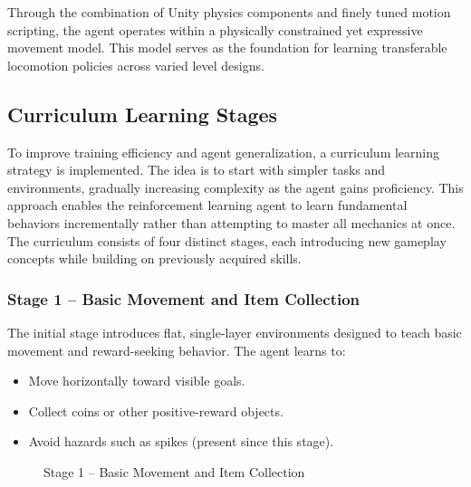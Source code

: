\documentclass[12pt,oneside,openright,a4paper]{cpe-english-project}
\begin{document}
Through the combination of Unity physics components and finely tuned motion scripting, the agent operates within a physically constrained yet expressive movement model. This model serves as the foundation for learning transferable locomotion policies across varied level designs.

\subsection{Curriculum Learning Stages}

To improve training efficiency and agent generalization, a curriculum learning strategy is implemented. The idea is to start with simpler tasks and environments, gradually increasing complexity as the agent gains proficiency. This approach enables the reinforcement learning agent to learn fundamental behaviors incrementally rather than attempting to master all mechanics at once. The curriculum consists of four distinct stages, each introducing new gameplay concepts while building on previously acquired skills.

\subsubsection{Stage 1 – Basic Movement and Item Collection}

The initial stage introduces flat, single-layer environments designed to teach basic movement and reward-seeking behavior. The agent learns to:

\begin{itemize}
\item Move horizontally toward visible goals.
\item Collect coins or other positive-reward objects.
\item Avoid hazards such as spikes (present since this stage).
\end{itemize}

\begin{figure}[H]
\centering
{}
\caption{Stage 1 – Basic Movement and Item Collection}\label{fig:Stage1}
\end{figure}
\end{document}
